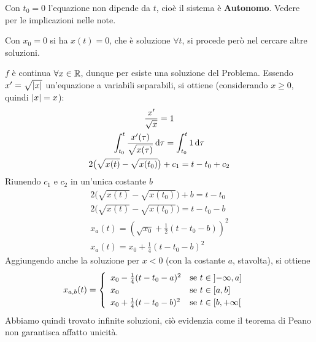 \begin{example}
\begin{solution}
		\begin{note}
			Con $t_0 = 0$ l'equazione non dipende da $t$, cioè il sistema è \textbf{Autonomo}. Vedere  per le implicazioni nelle note.
		\end{note}
		\begin{note}
			Con $x_0 = 0$ si ha $x(t)=0$, che è soluzione $\forall t$, si procede però nel cercare altre soluzioni.
		\end{note}
		$f$ è continua $\forall x \in \mathbb{R}$, dunque per  esiste una soluzione del Problema. Essendo $x' = \sqrt{\left|x\right|}$ un'equazione a variabili separabili, si ottiene (considerando $x \geq 0$, quindi $\left|x\right| = x$):
		\begin{equation*}
			\begin{gathered}
				\frac{x'}{\sqrt{x}} = 1\\
				\int_{t_0}^{t}{\frac{x'(\tau)}{\sqrt{x(\tau)}}\,\mathrm{d}{\tau}} = \int_{t_0}^{t} 1 \,\mathrm{d}{\tau}\\
				2\bigl(\sqrt{x(t)} - \sqrt{x(t_0)}\bigr) + c_1 = t - t_0 + c_2\\
			\end{gathered}
		\end{equation*}
		Riunendo $c_1$ e $c_2$ in un'unica costante $b$
		\begin{equation*}
			\begin{gathered}
				2\bigl(\sqrt{x(t)} - \sqrt{x(t_0)}\bigr) + b = t - t_0\\
				2\bigl(\sqrt{x(t)} - \sqrt{x(t_0)}\bigr) = t - t_0 - b\\
				x_a(t) = \left( \sqrt{x_0} + \frac{1}{2}(t-t_0-b) \right)^2\\
				x_a(t) = x_0 + \frac{1}{4}(t-t_0-b)^2
			\end{gathered}
		\end{equation*}
		Aggiungendo anche la soluzione per $x < 0$ (con la costante $a$, stavolta), si ottiene
		\begin{equation*}
			x_{a,b}(t) =
			\begin{cases}
				\begin{array}{ll}
					x_0 - \frac{1}{4}(t-t_0-a)^2 & \text{se } t \in \left]-\infty,a\right]\\
					x_0 & \text{se } t \in \left[a,b\right]\\
					x_0 + \frac{1}{4}(t-t_0-b)^2 & \text{se } t \in \left[b,+\infty\right[
				\end{array}
			\end{cases}
		\end{equation*}
		Abbiamo quindi trovato infinite soluzioni, ciò evidenzia come il teorema di Peano non garantisca affatto unicità.


\end{solution}
\end{example}

